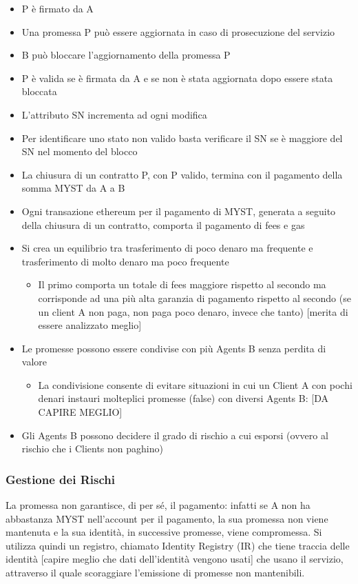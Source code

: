 \documentclass[]{article}
\begin{document}
	\begin{itemize}
	\item P è firmato da A
	\item Una promessa P può essere aggiornata in caso di prosecuzione del servizio
	\item B può bloccare l’aggiornamento della promessa P
	\item P è valida se è firmata da A e se non è stata aggiornata dopo essere stata bloccata
	\item L’attributo SN incrementa ad ogni modifica
	\item Per identificare uno stato non valido basta verificare il SN se è maggiore del SN nel momento del blocco
	\item La chiusura di un contratto P, con P valido, termina con il pagamento della somma MYST da A a B
	\item Ogni transazione ethereum per il pagamento di MYST, generata a seguito della chiusura di un contratto, comporta il pagamento di fees e gas
	\item Si crea un equilibrio tra trasferimento di poco denaro ma frequente e trasferimento di molto denaro ma poco frequente
	\begin{itemize}
	\item Il primo comporta un totale di fees maggiore rispetto al secondo ma corrisponde ad una più alta garanzia di pagamento rispetto al secondo (se un client A non paga, non paga poco denaro, invece che tanto) [merita di essere analizzato meglio]
	\end{itemize}
	\item Le promesse possono essere condivise con più Agents B senza perdita di valore
	\begin{itemize}
	\item La condivisione consente di evitare situazioni in cui un Client A con pochi denari instauri molteplici promesse (false) con diversi Agents B: [DA CAPIRE MEGLIO]
	\end{itemize}
	\item Gli Agents B possono decidere il grado di rischio a cui esporsi (ovvero al rischio che i Clients non paghino)
	\end{itemize}	

	\subsubsection{Gestione dei Rischi}	
	La promessa non garantisce, di per sé, il pagamento: infatti se A non ha abbastanza MYST nell'account per il pagamento, la sua promessa non viene mantenuta e la sua identità, in successive promesse, viene compromessa.
	Si utilizza quindi un registro, chiamato Identity Registry (IR) che tiene traccia delle identità [capire meglio che dati dell’identità vengono usati] che usano il servizio, attraverso il quale scoraggiare l’emissione di promesse non mantenibili.
	
\end{document}
